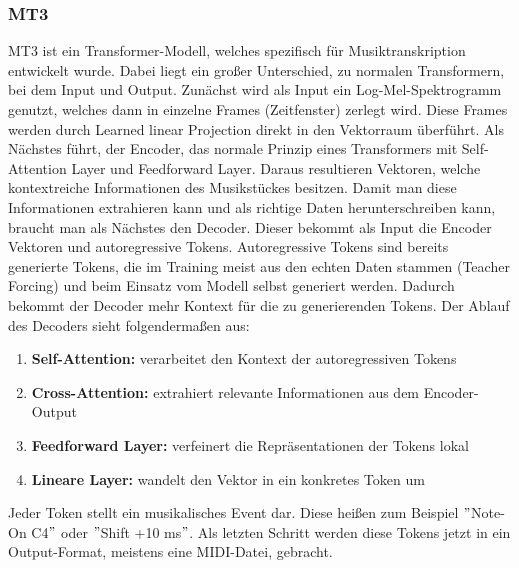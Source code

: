 \subsubsection{MT3}
MT3 ist ein Transformer-Modell, welches spezifisch für Musiktranskription entwickelt wurde.
Dabei liegt ein großer Unterschied, zu normalen Transformern, bei dem Input und Output.
Zunächst wird als Input ein Log-Mel-Spektrogramm genutzt, welches dann in einzelne Frames (Zeitfenster) zerlegt wird.
Diese Frames werden durch Learned linear Projection direkt in den Vektorraum überführt.
Als Nächstes führt, der Encoder, das normale Prinzip eines Transformers mit Self-Attention Layer und Feedforward Layer.
Daraus resultieren Vektoren, welche kontextreiche Informationen des Musikstückes besitzen.
Damit man diese Informationen extrahieren kann und als richtige Daten herunterschreiben kann,
braucht man als Nächstes den Decoder.
Dieser bekommt als Input die Encoder Vektoren und autoregressive Tokens.
Autoregressive Tokens sind bereits generierte Tokens,
die im Training meist aus den echten Daten stammen (Teacher Forcing)
und beim Einsatz vom Modell selbst generiert werden.
Dadurch bekommt der Decoder mehr Kontext für die zu generierenden Tokens.
Der Ablauf des Decoders sieht folgendermaßen aus:
\begin{enumerate}
  \item \textbf{Self-Attention:} verarbeitet den Kontext der autoregressiven Tokens
  \item \textbf{Cross-Attention:} extrahiert relevante Informationen aus dem Encoder-Output
  \item \textbf{Feedforward Layer:} verfeinert die Repräsentationen der Tokens lokal
  \item \textbf{Lineare Layer:} wandelt den Vektor in ein konkretes Token um
\end{enumerate}
Jeder Token stellt ein musikalisches Event dar.
Diese heißen zum Beispiel \("\)Note-On C4\("\) oder \("\)Shift +10 ms\("\).
Als letzten Schritt werden diese Tokens jetzt in ein Output-Format, meistens eine MIDI-Datei, gebracht.

